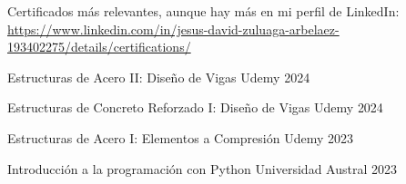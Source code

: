 
\begin{cvparagraph}

  Certificados más relevantes, aunque hay más en mi perfil de LinkedIn:\\\url{https://www.linkedin.com/in/jesus-david-zuluaga-arbelaez-193402275/details/certifications/}
  \end{cvparagraph}
\begin{cvhonors}

  \cvhonor
    {Estructuras de Acero II: Diseño de Vigas} %
    {Udemy} %
    {} %
    {2024} %

  \cvhonor
    {Estructuras de Concreto Reforzado I: Diseño de Vigas} %
    {Udemy} %
    {} %
    {2024} %

  \cvhonor
    {Estructuras de Acero I: Elementos a Compresión } %
    {Udemy} %
    {} %
    {2023} %

  \cvhonor
    {Introducción a la programación con Python} %
    {Universidad Austral} %
    {} %
    {2023} %

\end{cvhonors}